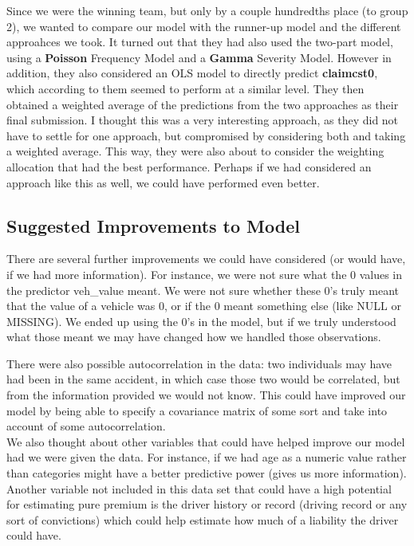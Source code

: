 \documentclass[a4paper]{article}\usepackage[]{graphicx}\usepackage[]{color}
\begin{document}
Since we were the winning team, but only by a couple hundredths place (to group 2), we wanted to compare our model with the runner-up model and the different approahces we took. It turned out that they had also used the two-part model, using a \textbf{Poisson} Frequency Model and a \textbf{Gamma} Severity Model. However in addition, they also considered an OLS model to directly predict \textbf{claimcst0}, which according to them seemed to perform at a similar level. They then obtained a weighted average of the predictions from the two approaches as their final submission. I thought this was a very interesting approach, as they did not have to settle for one approach, but compromised by considering both and taking a weighted average. This way, they were also about to consider the weighting allocation that had the best performance. Perhaps if we had considered an approach like this as well, we could have performed even better.

\subsection*{Suggested Improvements to Model}

There are several further improvements we could have considered (or would have, if we had more information). For instance, we were not sure what the 0 values in the predictor veh\_value meant. We were not sure whether these 0's truly meant that the value of a vehicle was 0, or if the 0 meant something else (like NULL or MISSING). We ended up using the 0's in the model, but if we truly understood what those meant we may have changed how we handled those observations. 

There were also possible autocorrelation in the data: two individuals may have had been in the same accident, in which case those two would be correlated, but from the information provided we would not know. This could have improved our model by being able to specify a covariance matrix of some sort and take into account of some autocorrelation.
\\

We also thought about other variables that could have helped improve our model had we were given the data. For instance, if we had age as a numeric value rather than categories might have a better predictive power (gives us more information). Another variable not included in this data set that could have a high potential for estimating pure premium is the driver history or record (driving record or any sort of convictions) which could help estimate how much of a liability the driver could have.
\end{document}
